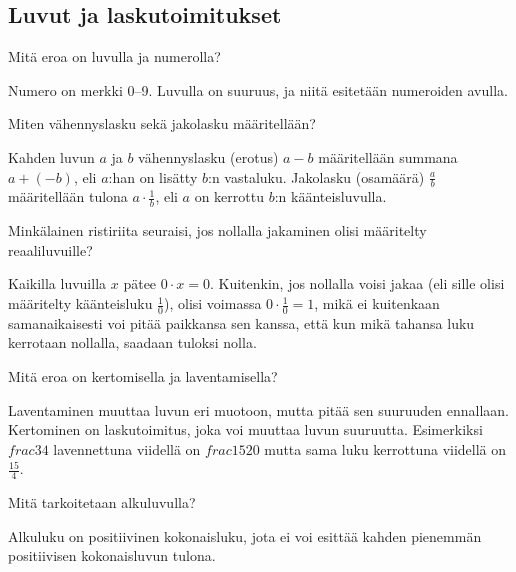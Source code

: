 \subsection*{Luvut ja laskutoimitukset}

\begin{tehtava}
Mitä eroa on luvulla ja numerolla?
\begin{vastaus}
Numero on merkki 0--9. Luvulla on suuruus, ja niitä esitetään numeroiden avulla. %
\end{vastaus}
\end{tehtava}

\begin{tehtava}
Miten vähennyslasku sekä jakolasku määritellään?
\begin{vastaus}
Kahden luvun $a$ ja $b$ vähennyslasku (erotus) $a-b$ määritellään summana $a+(-b)$, eli $a$:han on lisätty $b$:n vastaluku. Jakolasku (osamäärä) $\frac{a}{b}$ määritellään tulona $a\cdot \frac1b$, eli $a$ on kerrottu $b$:n käänteisluvulla.
\end{vastaus}
\end{tehtava}

\begin{tehtava}
Minkälainen ristiriita seuraisi, jos nollalla jakaminen olisi määritelty reaaliluvuille?
\begin{vastaus}
Kaikilla luvuilla $x$ pätee $0 \cdot x = 0$. Kuitenkin, jos nollalla voisi jakaa (eli sille olisi määritelty käänteisluku $\frac10$), olisi voimassa $0 \cdot\frac10 = 1$, mikä ei kuitenkaan samanaikaisesti voi pitää paikkansa sen kanssa, että kun mikä tahansa luku kerrotaan nollalla, saadaan tuloksi nolla.
\end{vastaus}
\end{tehtava}

\begin{tehtava}
Mitä eroa on kertomisella ja laventamisella?
\begin{vastaus}
Laventaminen muuttaa luvun eri muotoon, mutta pitää sen suuruuden ennallaan. Kertominen on laskutoimitus, joka voi muuttaa luvun suuruutta. Esimerkiksi $frac34$ lavennettuna viidellä on $frac{15}{20}$ mutta sama luku kerrottuna viidellä on $\frac{15}{4}$.
\end{vastaus}
\end{tehtava}

\begin{tehtava}
Mitä tarkoitetaan alkuluvulla?
\begin{vastaus}
Alkuluku on positiivinen kokonaisluku, jota ei voi esittää kahden pienemmän positiivisen kokonaisluvun tulona.
\end{vastaus}
\end{tehtava}

